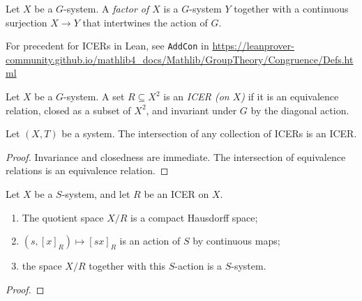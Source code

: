 \begin{definition}[Factor]
    \leanok{}
Let $X$ be a $G$-system.  A \emph{factor of $X$} is a $G$-system $Y$ together with a continuous surjection $X \to Y$ that intertwines the action of $G$.
\end{definition}

\begin{leanrmk}
    For precedent for ICERs in Lean, see \verb|AddCon| in \url{https://leanprover-community.github.io/mathlib4_docs/Mathlib/GroupTheory/Congruence/Defs.html}
\end{leanrmk}

\begin{definition}[ICER]
\leanok{}
    Let $X$ be a $G$-system.  A set $R \subseteq X^2$ is an \emph{ICER (on $X$)} if it is an equivalence relation, closed as a subset of $X^2$, and invariant under $G$ by the diagonal action.
\end{definition}

\begin{lemma}
\label{lemma_intersection_of_icers}
\leanok{}
    Let $(X,T)$ be a system.  The intersection of any collection of ICERs is an ICER.
\end{lemma}

\begin{proof}
\leanok{}
    Invariance and closedness are immediate. The intersection of equivalence relations is an equivalence relation.
\end{proof}

\begin{theorem}
\label{thm_quotient_system}
\leanok{}
    Let $X$ be a $S$-system, and let $R$ be an ICER on $X$.
    \begin{enumerate}
        \item The quotient space $X/R$ is a compact Hausdorff space;
        \item $(s,[x]_R) \mapsto [sx]_R$ is an action of $S$ by continuous maps;
        \item the space $X/R$ together with this $S$-action is a $S$-system.
    \end{enumerate}
\end{theorem}

\begin{proof}
\leanok{}
\end{proof}

